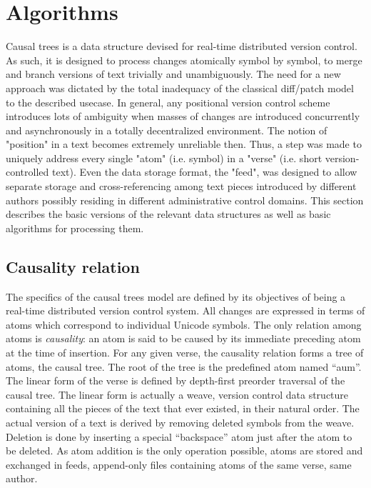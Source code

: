 \documentclass{acm_proc_article-sp}
\begin{document}
	
\section {Algorithms}

   Causal trees is a data structure devised for real-time distributed
   version control. As such, it is designed to process changes
   atomically symbol by symbol, to merge and branch versions of text
   trivially and unambiguously. The need for a new approach was
   dictated by the total inadequacy of the classical diff/patch model
   to the described usecase. In general, any positional version
   control scheme introduces lots of ambiguity when masses of changes
   are introduced concurrently and asynchronously in a totally
   decentralized environment. The notion of "position" in a text
   becomes extremely unreliable then. Thus, a step was made to
   uniquely address every single "atom" (i.e. symbol) in a "verse"
   (i.e. short version-controlled text). Even the data storage format,
   the "feed", was designed to allow separate storage and
   cross-referencing among text pieces introduced by different authors
   possibly residing in different administrative control domains. This
   section describes the basic versions of the relevant data
   structures as well as basic algorithms for processing them.
   
\subsection{Causality relation}   
   
   The specifics of the causal trees model are defined by its
   objectives of being a real-time distributed version control system.
   All changes are expressed in terms of atoms which correspond to
   individual Unicode symbols. The only relation among atoms is
   \emph{causality}: an atom is said to be caused by its immediate preceding
   atom at the time of insertion. For any given verse, the causality
   relation forms a tree of atoms, the causal tree.
   The root of the tree is the predefined atom named ``aum''.
   The linear form of the verse is defined by depth-first preorder
   traversal of the causal tree. The linear form is actually a weave,
   version control data structure containing all the pieces of the
   text that ever existed, in their natural order. The actual version
   of a text is derived by removing deleted symbols from the weave.
   Deletion is done by inserting a special ``backspace'' atom just
   after the atom to be deleted. 
   As atom addition is
   the only operation possible, atoms are stored and exchanged in
   feeds, append-only files containing atoms of the same verse, same
   author.
   
\end{document}
